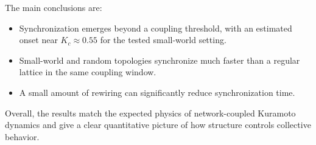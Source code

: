 \documentclass[12pt]{article}
\begin{document}
The main conclusions are:

\begin{itemize}
	\item Synchronization emerges beyond a coupling threshold, with an estimated onset near $K_c\approx 0.55$ for the tested small-world setting.
	\item Small-world and random topologies synchronize much faster than a regular lattice in the same coupling window.
	\item A small amount of rewiring can significantly reduce synchronization time.
\end{itemize}

Overall, the results match the expected physics of network-coupled Kuramoto dynamics and give a clear quantitative picture of how structure controls collective behavior.
\end{document}
